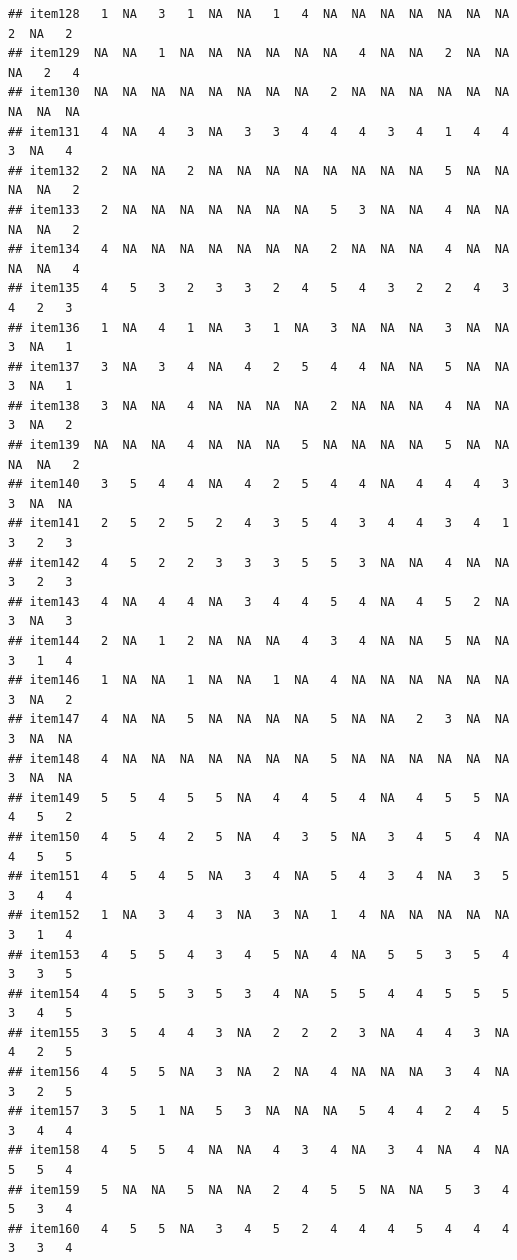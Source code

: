 \documentclass[
  man]{apa6}
\begin{document}
\begin{verbatim}
## item128   1  NA   3   1  NA  NA   1   4  NA  NA  NA  NA  NA  NA  NA   2  NA   2
## item129  NA  NA   1  NA  NA  NA  NA  NA  NA   4  NA  NA   2  NA  NA  NA   2   4
## item130  NA  NA  NA  NA  NA  NA  NA  NA   2  NA  NA  NA  NA  NA  NA  NA  NA  NA
## item131   4  NA   4   3  NA   3   3   4   4   4   3   4   1   4   4   3  NA   4
## item132   2  NA  NA   2  NA  NA  NA  NA  NA  NA  NA  NA   5  NA  NA  NA  NA   2
## item133   2  NA  NA  NA  NA  NA  NA  NA   5   3  NA  NA   4  NA  NA  NA  NA   2
## item134   4  NA  NA  NA  NA  NA  NA  NA   2  NA  NA  NA   4  NA  NA  NA  NA   4
## item135   4   5   3   2   3   3   2   4   5   4   3   2   2   4   3   4   2   3
## item136   1  NA   4   1  NA   3   1  NA   3  NA  NA  NA   3  NA  NA   3  NA   1
## item137   3  NA   3   4  NA   4   2   5   4   4  NA  NA   5  NA  NA   3  NA   1
## item138   3  NA  NA   4  NA  NA  NA  NA   2  NA  NA  NA   4  NA  NA   3  NA   2
## item139  NA  NA  NA   4  NA  NA  NA   5  NA  NA  NA  NA   5  NA  NA  NA  NA   2
## item140   3   5   4   4  NA   4   2   5   4   4  NA   4   4   4   3   3  NA  NA
## item141   2   5   2   5   2   4   3   5   4   3   4   4   3   4   1   3   2   3
## item142   4   5   2   2   3   3   3   5   5   3  NA  NA   4  NA  NA   3   2   3
## item143   4  NA   4   4  NA   3   4   4   5   4  NA   4   5   2  NA   3  NA   3
## item144   2  NA   1   2  NA  NA  NA   4   3   4  NA  NA   5  NA  NA   3   1   4
## item146   1  NA  NA   1  NA  NA   1  NA   4  NA  NA  NA  NA  NA  NA   3  NA   2
## item147   4  NA  NA   5  NA  NA  NA  NA   5  NA  NA   2   3  NA  NA   3  NA  NA
## item148   4  NA  NA  NA  NA  NA  NA  NA   5  NA  NA  NA  NA  NA  NA   3  NA  NA
## item149   5   5   4   5   5  NA   4   4   5   4  NA   4   5   5  NA   4   5   2
## item150   4   5   4   2   5  NA   4   3   5  NA   3   4   5   4  NA   4   5   5
## item151   4   5   4   5  NA   3   4  NA   5   4   3   4  NA   3   5   3   4   4
## item152   1  NA   3   4   3  NA   3  NA   1   4  NA  NA  NA  NA  NA   3   1   4
## item153   4   5   5   4   3   4   5  NA   4  NA   5   5   3   5   4   3   3   5
## item154   4   5   5   3   5   3   4  NA   5   5   4   4   5   5   5   3   4   5
## item155   3   5   4   4   3  NA   2   2   2   3  NA   4   4   3  NA   4   2   5
## item156   4   5   5  NA   3  NA   2  NA   4  NA  NA  NA   3   4  NA   3   2   5
## item157   3   5   1  NA   5   3  NA  NA  NA   5   4   4   2   4   5   3   4   4
## item158   4   5   5   4  NA  NA   4   3   4  NA   3   4  NA   4  NA   5   5   4
## item159   5  NA  NA   5  NA  NA   2   4   5   5  NA  NA   5   3   4   5   3   4
## item160   4   5   5  NA   3   4   5   2   4   4   4   5   4   4   4   3   3   4

\end{verbatim}
\end{document}
